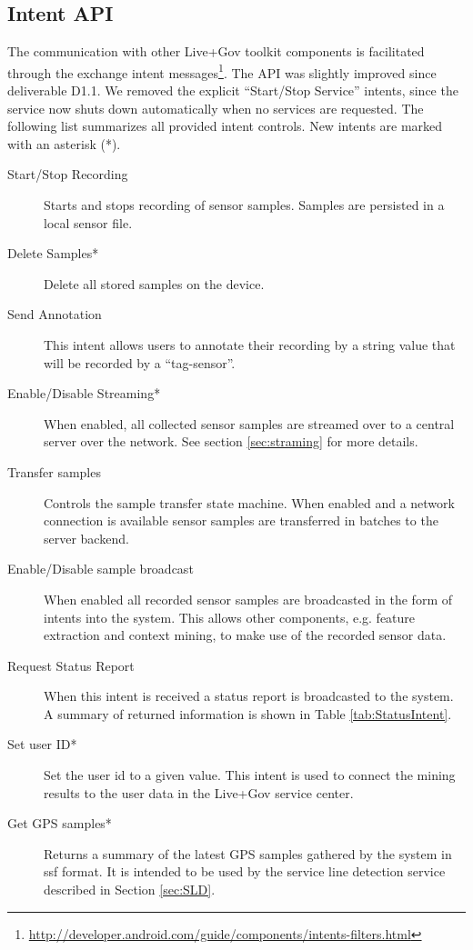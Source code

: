 \subsection{Intent API}
\label{subsubsec:IntentAPIdescription}

The communication with other Live+Gov toolkit components is
facilitated through the exchange intent
messages\footnote{\url{http://developer.android.com/guide/components/intents-filters.html}}.
The API was slightly improved since deliverable D1.1. We removed the
explicit ``Start/Stop Service'' intents, since the service now shuts
down automatically when no services are requested. The following list
summarizes all provided intent controls. New intents are marked with
an asterisk (*).

\begin{description}
\item[Start/Stop Recording] Starts and stops recording of
  sensor samples. Samples are persisted in a local sensor file.
\item[Delete Samples*] Delete all stored samples on the
  device.
\item[Send Annotation] This intent allows users to annotate
  their recording by a string value that will be recorded by a
  ``tag-sensor''.
\item[Enable/Disable Streaming*] When enabled, all
  collected sensor samples are streamed over to a central server over
  the network. See section \ref{sec:straming} for more details.
\item[Transfer samples]  Controls the sample transfer
  state machine. When enabled and a network connection is available
  sensor samples are transferred in batches to the server backend.
\item[Enable/Disable sample broadcast] When enabled all
  recorded sensor samples are broadcasted in the form of intents into
  the system. This allows other components, e.g. feature extraction
  and context mining, to make use of the recorded sensor data.
\item[Request Status Report] When this intent is received
  a status report is broadcasted to the system. A summary of returned
  information is shown in Table \ref{tab:StatusIntent}.
\item[Set user ID*] Set the user id to a given value. This
  intent is used to connect the mining results to the user data in the
  Live+Gov service center.
\item[Get GPS samples*] Returns a summary of the latest
  GPS samples gathered by the system in ssf format. It is intended to
  be used by the service line detection service described in Section \ref{sec:SLD}.
\end{description}

